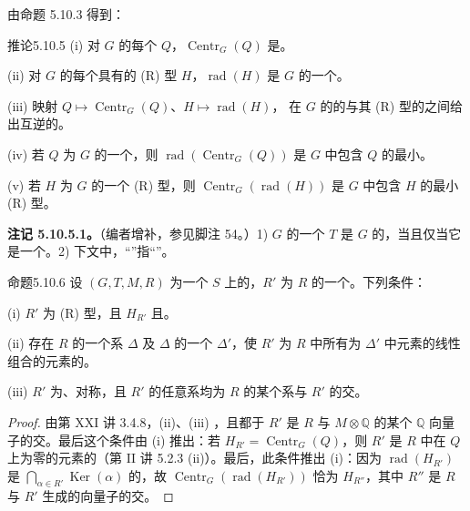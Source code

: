 由命题 5.10.3 得到：
\begin{SGAresult}{推论}{5.10.5}
(i) 对 $G$ 的每个 $Q$，$\operatorname{Centr}_G(Q)$ 是。

(ii) 对 $G$ 的每个具有的 (R) 型 $H$，$\operatorname{rad}(H)$ 是 $G$ 的一个。

(iii) 映射 $Q\mapsto\operatorname{Centr}_G(Q)$、$H\mapsto\operatorname{rad}(H)$，
在 $G$ 的的与其 (R) 型的之间给出互逆的。

(iv) 若 $Q$ 为 $G$ 的一个，则 $\operatorname{rad}(\operatorname{Centr}_G(Q))$ 是 $G$ 中包含 $Q$ 的最小。

(v) 若 $H$ 为 $G$ 的一个 (R) 型，则 $\operatorname{Centr}_G(\operatorname{rad}(H))$ 是 $G$ 中包含 $H$ 的最小 (R) 型。
\end{SGAresult}
\textbf{注记 5.10.5.1。}（编者增补，参见脚注 54。）1) $G$ 的一个 $T$ 是 $G$ 的，当且仅当它是一个。2) 下文中，“”指“”。
\begin{SGAresult}{命题}{5.10.6}
设 $(G,T,M,R)$ 为一个 $S$ 上的，$R'$ 为 $R$ 的一个。下列条件：

(i) $R'$ 为 (R) 型，且 $H_{R'}$ 且。

(ii) 存在 $R$ 的一个系 $\Delta$ 及 $\Delta$ 的一个 $\Delta'$，使 $R'$ 为 $R$ 中所有为 $\Delta'$ 中元素的线性组合的元素的。

(iii) $R'$ 为、对称，且 $R'$ 的任意系均为 $R$ 的某个系与 $R'$ 的交。
\end{SGAresult}
\begin{proof}
由第 XXI 讲 3.4.8，(ii)、(iii) ，且都于 $R'$ 是 $R$ 与 $M\otimes\mathbb Q$ 的某个 $\mathbb Q$ 向量子的交。最后这个条件由 (i) 推出：若 $H_{R'}=\operatorname{Centr}_G(Q)$，则 $R'$ 是 $R$ 中在 $Q$ 上为零的元素的（第 II 讲 5.2.3 (ii)）。最后，此条件推出 (i)：因为 $\operatorname{rad}(H_{R'})$ 是 $\bigcap_{\alpha\in R'}\operatorname{Ker}(\alpha)$ 的，故 $\operatorname{Centr}_G(\operatorname{rad}(H_{R'}))$ 恰为 $H_{R''}$，其中 $R''$ 是 $R$ 与 $R'$ 生成的向量子的交。
\end{proof}
